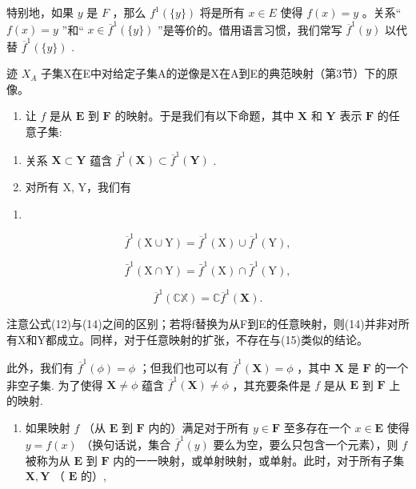 特别地，如果 \(y\) 是 \(F\) ，那么 \(f^{1}(\{y\})\) 将是所有 \(x \in E\) 使得 \(f(x) = y\) 。关系“ \(f(x) = y\) ”和“ \(x \in \overline{f}^{1}(\{y\})\) ”是等价的。借用语言习惯，我们常写 \(\overline{f}^{1}(y)\) 以代替 \(\overline{f}^{1}(\{y\})\) .

迹 \(X_{A}\) 子集X在E中对给定子集A的逆像是X在A到E的典范映射（第3节）下的原像。

\begin{enumerate}
\def\labelenumi{\arabic{enumi}.}
\setcounter{enumi}{6}
\tightlist
\item
  让 \(f\) 是从 \(\mathbf{E}\) 到 \(\mathbf{F}\) 的映射。于是我们有以下命题，其中 \(\mathbf{X}\) 和 \(\mathbf{Y}\) 表示 \(\mathbf{F}\) 的任意子集:
\end{enumerate}

\begin{enumerate}
\def\labelenumi{(\alph{enumi})}
\item
  关系 \(\mathbf{X} \subset \mathbf{Y}\) 蕴含 \(\overline{f}^1(\mathbf{X}) \subset \overline{f}^1(\mathbf{Y})\) .
\item
  对所有 X, Y，我们有
\end{enumerate}

\begin{enumerate}
\def\labelenumi{(\arabic{enumi})}
\setcounter{enumi}{12}
\tightlist
\item
\end{enumerate}

\[
\overline {{f}} ^ {1} (\mathrm{X} \cup \mathrm{Y}) = \overline {{f}} ^ {1} (\mathrm{X}) \cup \overline {{f}} ^ {1} (\mathrm{Y}),\tag{14}
\]

\[
\bar {f} ^ {1} (\mathrm{X} \cap \mathrm{Y}) = \bar {f} ^ {1} (\mathrm{X}) \cap \bar {f} ^ {1} (\mathrm{Y}),\tag{15}
\]

\[
\overline {{f}} ^ {1} (\mathbb {C X}) = \mathbb {C} \overline {{f}} ^ {1} (\mathbf {X}).
\]

注意公式(12)与(14)之间的区别；若将f替换为从F到E的任意映射，则(14)并非对所有X和Y都成立。同样，对于任意映射的扩张，不存在与(15)类似的结论。

此外，我们有 \(\overline{f}^{1}(\phi) = \phi\) ；但我们也可以有 \(\overline{f}^{1}(\mathbf{X}) = \phi\) ，其中 \(\mathbf{X}\) 是 \(\mathbf{F}\) 的一个非空子集. 为了使得 \(\mathbf{X} \neq \phi\) 蕴含 \(\overline{f}^{1}(\mathbf{X}) \neq \phi\) ，其充要条件是 \(f\) 是从 \(\mathbf{E}\) 到 \(\mathbf{F}\) 上的映射.

\begin{enumerate}
\def\labelenumi{\arabic{enumi}.}
\setcounter{enumi}{7}
\tightlist
\item
  如果映射 \(f\) （从 \(\mathbf{E}\) 到 \(\mathbf{F}\) 内的）满足对于所有 \(y \in \mathbf{F}\) 至多存在一个 \(x \in \mathbf{E}\) 使得 \(y = f(x)\) （换句话说，集合 \(\overline{f}^1(y)\) 要么为空，要么只包含一个元素），则 \(f\) 被称为从 \(\mathbf{E}\) 到 \(\mathbf{F}\) 内的一一映射，或单射映射，或单射。此时，对于所有子集 \(\mathbf{X}, \mathbf{Y}\) （ \(\mathbf{E}\) 的）,
\end{enumerate}

